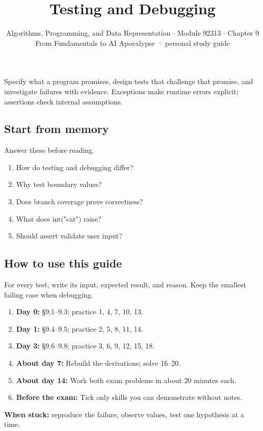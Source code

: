 \documentclass[11pt]{article}
\title{\sffamily\bfseries\color{FAUblue}Testing and Debugging}
\author{Algorithms, Programming, and Data Representation \ensuremath{\cdot} Module 92313 \ensuremath{\cdot} Chapter 9\\[2pt]\small From Fundamentals to AI Apocalypse · personal study guide}
\date{}
\begin{document}
\maketitle
\begingroup\footnotesize\setlength{\parskip}{0pt}\tableofcontents\endgroup
\clearpage

{\large Specify what a program promises, design tests that challenge that promise, and investigate failures with evidence. Exceptions make runtime errors explicit; assertions check internal assumptions.}


\begin{keepsection}
\section{Start from memory}

Answer these before reading.

\begin{enumerate}
\item How do testing and debugging differ?
\item Why test boundary values?
\item Does branch coverage prove correctness?
\item What does int("cat") raise?
\item Should assert validate user input?
\end{enumerate}

\end{keepsection}

\begin{keepsection}
\section{How to use this guide}

For every test, write its input, expected result, and reason. Keep the smallest failing case when debugging.

\begin{enumerate}
\item \textbf{Day 0:} §9.1–9.3; practice 1, 4, 7, 10, 13.
\item \textbf{Day 1:} §9.4–9.5; practice 2, 5, 8, 11, 14.
\item \textbf{Day 3:} §9.6–9.8; practice 3, 6, 9, 12, 15, 18.
\item \textbf{About day 7:} Rebuild the derivations; solve 16–20.
\item \textbf{About day 14:} Work both exam problems in about 20 minutes each.
\item \textbf{Before the exam:} Tick only skills you can demonstrate without notes.
\end{enumerate}

\begin{notebox}\textbf{When stuck:} reproduce the failure, observe values, test one hypothesis at a time.\end{notebox}
\end{keepsection}
\end{document}

